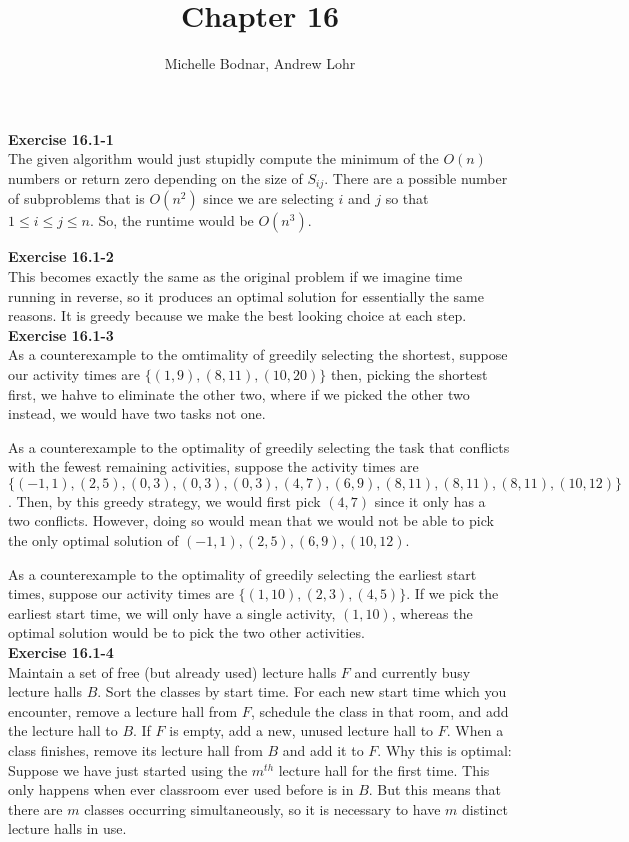 \documentclass{article}
\title{Chapter 16}
\author{Michelle Bodnar, Andrew Lohr}
\begin{document}
\maketitle

\noindent\textbf{Exercise 16.1-1}\\

The given algorithm would just stupidly compute the minimum of the $O(n)$ numbers or return zero depending on the size of $S_{ij}$. There are a possible number of subproblems that is $O(n^2)$ since we are selecting $i$ and $j$ so that $1\le i \le j\le n$. So, the runtime would be $O(n^3)$. 

\noindent\textbf{Exercise 16.1-2}\\

This becomes exactly the same as the original problem if we imagine time running in reverse, so it produces an optimal solution for essentially the same reasons.  It is greedy because we make the best looking choice at each step.\\

\noindent\textbf{Exercise 16.1-3}\\

As a counterexample to the omtimality of greedily selecting the shortest, suppose our activity times are $\{(1,9),(8,11),(10,20)\}$ then, picking the shortest first, we hahve to eliminate the other two, where if we picked the other two instead, we would have two tasks not one.

As a counterexample to the optimality of greedily selecting the task that conflicts with the fewest remaining activities, suppose the activity times are $\{(-1,1),(2,5),(0,3),(0,3),(0,3),(4,7),(6,9),(8,11),(8,11),(8,11),(10,12)\}$. Then, by this greedy strategy, we would first pick $(4,7)$ since it only has a two conflicts. However, doing so would mean that we would not be able to pick the only optimal solution of $(-1,1),(2,5),(6,9),(10,12)$.

As a counterexample to the optimality of greedily selecting the earliest start times, suppose our activity times are $\{(1,10),(2,3),(4,5)\}$. If we pick the earliest start time, we will only have a single activity, $(1,10)$, whereas the optimal solution would be to pick the two other activities.\\

\noindent\textbf{Exercise 16.1-4}\\

Maintain a set of free (but already used) lecture halls $F$ and currently busy lecture halls $B$.  Sort the classes by start time.  For each new start time which you encounter, remove a lecture hall from $F$, schedule the class in that room, and add the lecture hall to $B$. If $F$ is empty, add a new, unused lecture hall to $F$.  When a class finishes, remove its lecture hall from $B$ and add it to $F$.  Why this is optimal:  Suppose we have just started using the $m^{th}$ lecture hall for the first time.  This only happens when ever classroom ever used before is in $B$.  But this means that there are $m$ classes occurring simultaneously, so it is necessary to have $m$ distinct lecture halls in use.  \\
\end{document}
